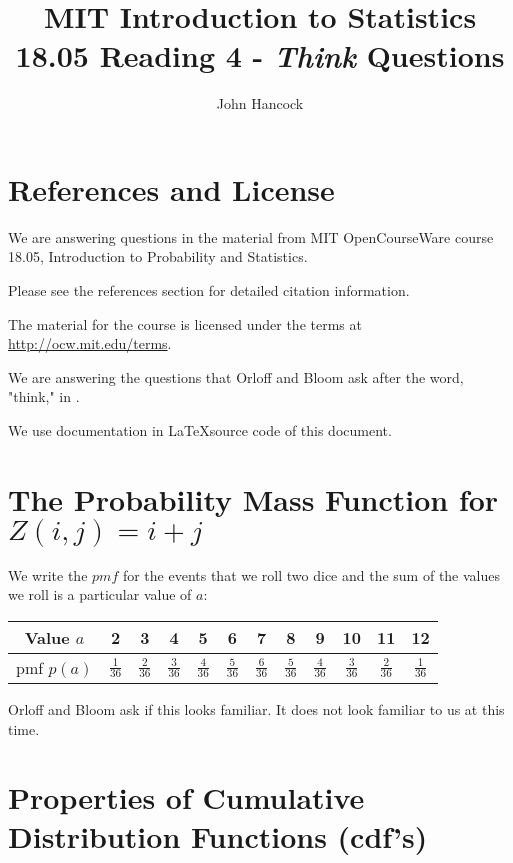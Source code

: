 \documentclass[a4paper,11pt]{article}
\author{John Hancock}
\title{MIT Introduction to Statistics 18.05 Reading 4 - \textit{Think}
  Questions }
\begin{document}
\maketitle
\tableofcontents
\section{References and License}
We are answering questions in the material from MIT OpenCourseWare
course 18.05, Introduction to Probability and Statistics.

Please see the references section for detailed citation information.

The material for the course is licensed under the terms at 
\url{http://ocw.mit.edu/terms}.

We are answering the questions that Orloff and Bloom ask after
the word, "think," in \cite{reading4}.

We use documentation in \cite{latexSymbols} \LaTeX source code of this
document.
 
\label{prob1}
\section{The Probability Mass Function for $ Z\left( i, j \right) = i + j$}

We write the $pmf$ for the events that we roll two dice and the sum
of the values we roll is a particular value of $a$:
\begin{center}
  \begin{tabular}{ | c | c | c | c | c |c |c | c | c | c | c |c |}
    \hline
    Value $a$ & 2 & 3 & 4 & 5 & 6 & 7 & 8 & 9 & 10 & 11 & 12\\ \hline
    pmf $p \left( a \right)$  & $\frac{1}{36}$ & $\frac{2}{36}$ & 
      $\frac{3}{36}$ & $\frac{4}{36}$ & $\frac{5}{36}$ & 
      $\frac{6}{36}$ & $\frac{5}{36}$ & $\frac{4}{36}$ & 
      $\frac{3}{36}$ & $\frac{2}{36}$ & $\frac{1}{36}$\\ \hline
  \end{tabular}
\end{center}

Orloff and Bloom ask if this looks familiar.  It does not look familiar
to us at this time.

\section{Properties of Cumulative Distribution Functions (cdf's)}
\end{document}
